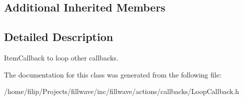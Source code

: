 \subsection*{Additional Inherited Members}


\subsection{Detailed Description}
Item\+Callback to loop other callbacks. 

The documentation for this class was generated from the following file\+:\begin{DoxyCompactItemize}
\item 
/home/filip/\+Projects/fillwave/inc/fillwave/actions/callbacks/Loop\+Callback.\+h\end{DoxyCompactItemize}
